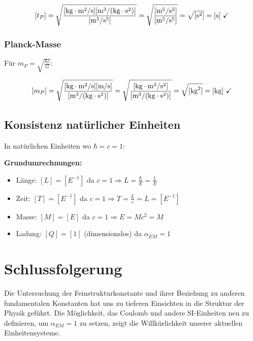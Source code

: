 \documentclass[12pt,a4paper]{article}
\begin{document}
	$$[t_P] = \sqrt{\frac{[\text{kg}\cdot\text{m}^2/\text{s}][\text{m}^3/(\text{kg}\cdot\text{s}^2)]}{[\text{m}^5/\text{s}^5]}} = \sqrt{\frac{[\text{m}^5/\text{s}^3]}{[\text{m}^5/\text{s}^5]}} = \sqrt{[\text{s}^2]} = [\text{s}] \text{ \checkmark}$$
	
	\subsubsection{Planck-Masse}
	Für $m_P = \sqrt{\frac{\hbar c}{G}}$:
	
	$$[m_P] = \sqrt{\frac{[\text{kg}\cdot\text{m}^2/\text{s}][\text{m/s}]}{[\text{m}^3/(\text{kg}\cdot\text{s}^2)]}} = \sqrt{\frac{[\text{kg}\cdot\text{m}^3/\text{s}^2]}{[\text{m}^3/(\text{kg}\cdot\text{s}^2)]}} = \sqrt{[\text{kg}^2]} = [\text{kg}] \text{ \checkmark}$$
	
	\subsection{Konsistenz natürlicher Einheiten}
	
	In natürlichen Einheiten wo $\hbar = c = 1$:
	
	\begin{tcolorbox}[colback=green!5!white,colframe=green!75!black,title=Dimensionale Konsistenz natürlicher Einheiten]
		\textbf{Grundumrechnungen:}
		\begin{itemize}
			\item Länge: $[L] = [E^{-1}]$ da $c = 1 \Rightarrow L = \frac{\hbar}{E} = \frac{1}{E}$
			\item Zeit: $[T] = [E^{-1}]$ da $c = 1 \Rightarrow T = \frac{L}{c} = L = [E^{-1}]$
			\item Masse: $[M] = [E]$ da $c = 1 \Rightarrow E = Mc^2 = M$
			\item Ladung: $[Q] = [1]$ (dimensionslos) da $\alpha_{EM} = 1$
		\end{itemize}
	\end{tcolorbox}
	
	\section{Schlussfolgerung}
	
	Die Untersuchung der Feinstrukturkonstante und ihrer Beziehung zu anderen fundamentalen Konstanten hat uns zu tieferen Einsichten in die Struktur der Physik geführt. Die Möglichkeit, das Coulomb und andere SI-Einheiten neu zu definieren, um $\alpha_{EM} = 1$ zu setzen, zeigt die Willkürlichkeit unserer aktuellen Einheitensysteme.
	
\end{document}
